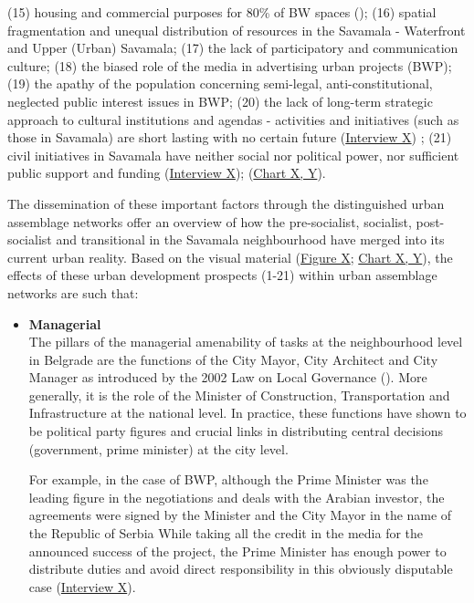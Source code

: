 \documentclass[11pt]{report}
\begin{document}
{{{{(15) housing and commercial purposes for 80\% of BW spaces (\href{Zekovic}{\citealt{zekovic_megaprojects_2016}}); 
(16) spatial fragmentation and unequal distribution of resources in the Savamala - Waterfront and Upper (Urban) Savamala;
(17) the lack of participatory and communication culture;
(18) the biased role of the media in advertising urban projects (BWP);
(19) the apathy of the population concerning semi-legal, anti-constitutional, neglected public interest issues in BWP;
(20) the lack of long-term strategic approach to cultural institutions and agendas - activities and initiatives (such as those in Savamala) are short lasting with no certain future (\href{InterviewX}{Interview X})
; 
(21) civil initiatives in Savamala have neither social nor political power, nor sufficient public support and funding (\href{InterviewX}{Interview X});
(\href{Table 5, 6}{Chart X, Y}). 

The dissemination of these important factors through the distinguished urban assemblage networks offer an overview of how the pre-socialist, socialist, post-socialist and transitional in the Savamala neighbourhood have merged into its current urban reality.
Based on the visual material (\href{ANT diagram}{Figure X}; \href{aspect tables 5,6}{Chart X, Y}), the effects of these urban development prospects (1-21) within urban assemblage networks are such that:
\\

\begin{itemize}
\item \textbf{Managerial}
\\
The pillars of the managerial amenability of tasks at the neighbourhood level in Belgrade are the functions of the City Mayor, City Architect and City Manager as introduced by the 2002 Law on Local Governance (\href{Vujovic}{\citealt{vujovic_belgrades_2007}}).
More generally, it is the role of the Minister of Construction, Transportation and Infrastructure at the national level.
In practice, these functions have shown to be political party figures and crucial links in distributing central decisions (government, prime minister) at the city level.

For example, in the case of BWP, although the Prime Minister was the leading figure in the negotiations and deals with the Arabian investor, the agreements were signed by the Minister and the City Mayor in the name of the Republic of Serbia
While taking all the credit in the media for the announced success of the project, the Prime Minister has enough power to distribute duties and avoid direct responsibility in this obviously disputable case (\href{InterviewX}{Interview X}).


\end{itemize}}}}}
\end{document}

